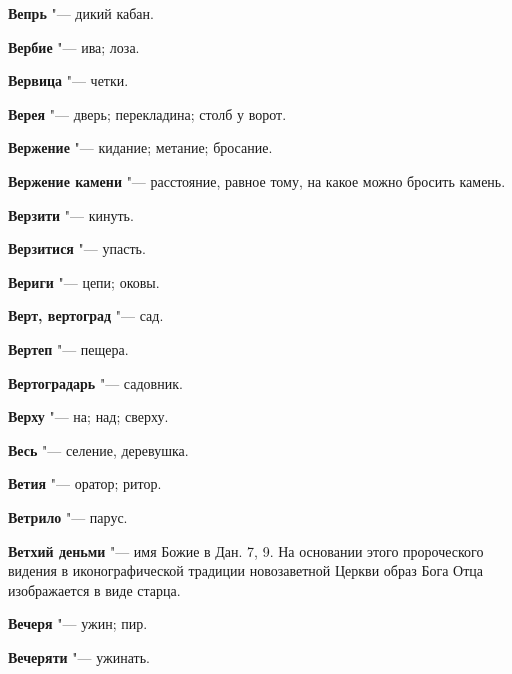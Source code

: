 \begin{mymulticols}{2}
\noindent\textbf{Вепрь} "--- дикий кабан. 




\noindent\textbf{Вербие} "--- ива; лоза. 




\noindent\textbf{Вервица} "--- четки. 




\noindent\textbf{Верея} "--- дверь; перекладина; столб у ворот. 




\noindent\textbf{Вержение} "--- кидание; метание; бросание. 




\noindent\textbf{Вержение камени} "--- расстояние, равное тому, на какое можно бросить камень. 




\noindent\textbf{Верзити} "--- кинуть. 




\noindent\textbf{Верзитися} "--- упасть. 




\noindent\textbf{Вериги} "--- цепи; оковы. 




\noindent\textbf{Верт, вертоград} "--- сад. 




\noindent\textbf{Вертеп} "--- пещера. 




\noindent\textbf{Вертоградарь} "--- садовник. 




\noindent\textbf{Верху} "--- на; над; сверху. 




\noindent\textbf{Весь} "--- селение, деревушка. 




\noindent\textbf{Ветия} "--- оратор; ритор. 




\noindent\textbf{Ветрило} "--- парус. 




\noindent\textbf{Ветхий деньми} "--- имя Божие в Дан. 7, 9. На основании этого пророческого видения в иконографической традиции новозаветной Церкви образ Бога Отца изображается в виде старца. 




\noindent\textbf{Вечеря} "--- ужин; пир. 




\noindent\textbf{Вечеряти} "--- ужинать. 





\end{mymulticols}
